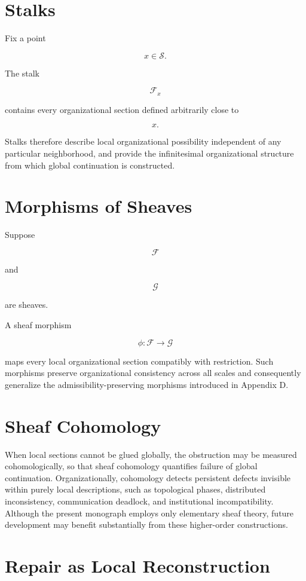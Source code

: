 \documentclass[11pt,oneside]{book}
\numberwithin{equation}{chapter}
\theoremstyle{definition}
\theoremstyle{plain}
\begin{document}
\section{Stalks}

Fix a point

\[
x
\in
\mathcal S.
\]

The stalk

\[
\mathcal F_x
\]

contains every organizational section defined arbitrarily close to

\[
x.
\]

Stalks therefore describe local organizational possibility independent of any particular neighborhood, and provide the infinitesimal organizational structure from which global continuation is constructed.

\section{Morphisms of Sheaves}

Suppose

\[
\mathcal F
\]

and

\[
\mathcal G
\]

are sheaves.

A sheaf morphism

\[
\phi
:
\mathcal F
\rightarrow
\mathcal G
\]

maps every local organizational section compatibly with restriction. Such morphisms preserve organizational consistency across all scales and consequently generalize the admissibility-preserving morphisms introduced in Appendix D.

\section{Sheaf Cohomology}

When local sections cannot be glued globally, the obstruction may be measured cohomologically, so that sheaf cohomology quantifies failure of global continuation. Organizationally, cohomology detects persistent defects invisible within purely local descriptions, such as topological phases, distributed inconsistency, communication deadlock, and institutional incompatibility. Although the present monograph employs only elementary sheaf theory, future development may benefit substantially from these higher-order constructions.

\section{Repair as Local Reconstruction}
\end{document}
